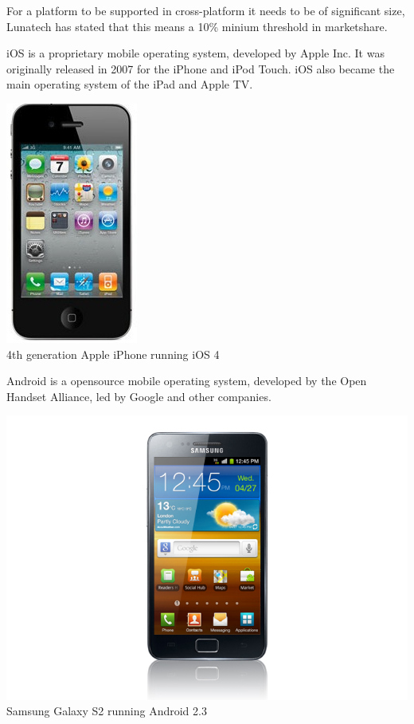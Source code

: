 For a platform to be supported in cross-platform it needs to be of significant size, Lunatech has stated that this means a 10\% minium threshold in marketshare.



iOS is a proprietary mobile operating system, developed by Apple Inc. It was originally released in 2007 for the iPhone and iPod Touch. iOS also became the main operating system of the iPad and Apple TV.

\begin{centering}
\includegraphics[scale=0.5]{images/iphone4.jpg}\\{4th generation Apple iPhone running iOS 4}\\
\end{centering}

Android is a opensource mobile operating system, developed by the Open Handset Alliance, led by Google and other companies.\cite{Inc.2012}

\begin{centering}
\includegraphics[scale=0.35]{images/android_sgs2.jpg}\\{Samsung Galaxy S2 running Android 2.3}\\
\end{centering}


